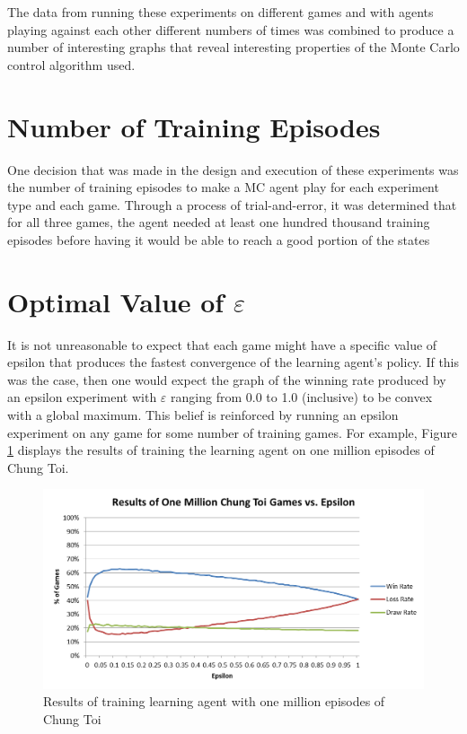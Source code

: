 \documentclass[11pt,a4paper]{report}
\begin{document}
The data from running these experiments on different games and with agents playing against each other different numbers of times was combined to produce a number of interesting graphs that reveal interesting properties of the Monte Carlo control algorithm used.


\section{Number of Training Episodes}

One decision that was made in the design and execution of these experiments was the number of training episodes to make a MC agent play for each experiment type and each game. Through a process of trial-and-error, it was determined that for all three games, the agent needed at least one hundred thousand training episodes before having it would be able to reach a good portion of the states


\section{Optimal Value of $\varepsilon$}

It is not unreasonable to expect that each game might have a specific value of epsilon that produces the fastest convergence of the learning agent's policy. If this was the case, then one would expect the graph of the winning rate produced by an epsilon experiment with $\varepsilon$ ranging from 0.0 to 1.0 (inclusive) to be convex with a global maximum. This belief is reinforced by running an epsilon experiment on any game for some number of training games. For example, Figure \ref{chung-toi-epsilon-1M-graph} displays the results of training the learning agent on one million episodes of Chung Toi.

\begin{figure}[htbp]
	\begin{center}
		\includegraphics[width=125mm]{ChungToi_EpsilonResults_1MGames.png}
		\caption{Results of training learning agent with one million episodes of Chung Toi}
		\label{chung-toi-epsilon-1M-graph}
	\end{center}
\end{figure}
\end{document}
